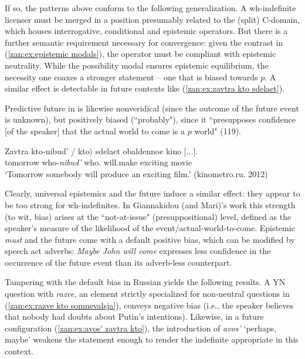 \documentclass[output=paper,colorlinks,citecolor=brown]{langscibook}
\begin{document}
If so, the patterns above conform to the following generalization. A wh-inde\-finite licenser must be merged in a position presumably related to the (split) C-domain, which houses interrogative, conditional and epistemic operators. But there is a further semantic requirement necessary for convergence: given the contrast in (\ref{zan:ex:epistemic modals}), the operator must be compliant with epistemic neutrality. While the possibility modal ensures epistemic equilibrium, the necessity one coaxes a stronger statement -- one that is biased towards $p$. A similar effect is detectable in future contexts like (\ref{zan:ex:zavtra kto sdelaet}). 

Predictive future in \citet{giannakidou2013two} is likewise nonveridical (since the outcome of the future event is unknown), but positively biased (``probably"), since it ``presupposes confidence [of the speaker] that the actual world to come is a $p$ world" (119).  

\ea \label{zan:ex:zavtra kto sdelaet}
    \gll Zavtra kto-nibud' / \minsp{$\langle$} \minsp{*} kto$\rangle$ sdelaet obaldennoe kino [...].\\
        tomorrow  who-\textit{nibud'} {} {} {} who.{\INDF} will.make exciting movie\\
    \glt `Tomorrow somebody will produce an exciting film.’ \hfill{(kinometro.ru. 2012)}
\z

\noindent Clearly, universal epistemics and the future induce a similar effect: they appear to be too strong for wh-indefinites. In Giannakidou (and Mari)'s work this strength (to wit, bias) arises at the ``not-at-issue" (presuppositional) level, defined as the speaker's measure of the likelihood of the event/actual-world-to-come. Epistemic \textit{must} and the future come with a default positive bias, which can be modified by speech act adverbs: \textit{Maybe John will come} expresses less confidence in the occurrence of the future event than its adverb-less counterpart. 

Tampering with the default bias in Russian yields the following results. A YN question with \textit{razve}, an element strictly specialized for non-neutral questions in (\ref{zan:ex:razve kto somnevalsja}), conveys negative bias (i.e., the speaker believes that nobody had doubts about Putin's intentions). Likewise, in a future configuration (\ref{zan:ex:avos' zavtra kto}), the introduction of \textit{avos'} `perhaps, maybe' weakens the statement enough to render the indefinite appropriate in this context.
\end{document}
